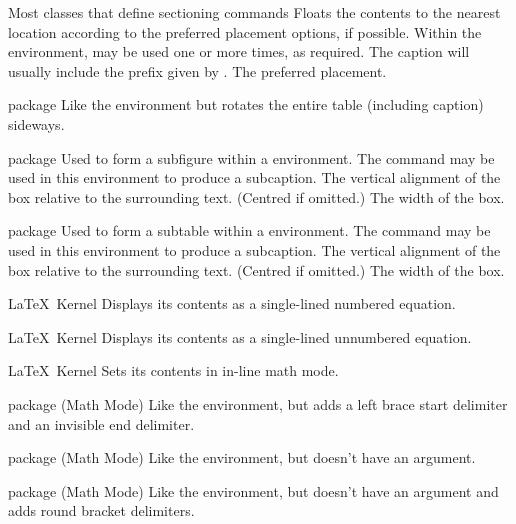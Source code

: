  {}%
 {Most classes that define sectioning commands}%
 {%
   Floats the contents to the nearest location according to the
   preferred placement options, if possible. Within the environment,
    may be used one or more times, as required.
   The caption will usually include the prefix given by
   .
 }%
 {%
   \BeginArgList
     The preferred placement.
   \EndArgList
 }

%
 {}%
 { package}%
 {Like the  environment but rotates the entire
  table (including caption) sideways.}%
 {}

%
 {}%
 { package}%
 {Used to form a subfigure within a 
  environment. The  command may be used in this
  environment to produce a subcaption.}%
 {%
   \BeginArgList
     The vertical alignment of the box relative to
     the surrounding text. (Centred if omitted.)
     The width of the box.
   \EndArgList
 }

%
 {}%
 { package}%
 {Used to form a subtable within a 
  environment. The  command may be used in this
  environment to produce a subcaption.}%
 {%
   \BeginArgList
     The vertical alignment of the box relative to
     the surrounding text. (Centred if omitted.)
     The width of the box.
   \EndArgList
 }

%
 {}%
 {\LaTeX\ Kernel}%
 {Displays its contents as a single-lined numbered equation.}%
 {}

%
 {}%
 {\LaTeX\ Kernel}%
 {Displays its contents as a single-lined unnumbered equation.}%
 {}

%
 {}%
 {\LaTeX\ Kernel}%
 {Sets its contents in in-line math mode.}%
 {}

%
 {}%
 { package (Math Mode)}%
 {%
   Like the  environment, but adds a left
   brace start delimiter and an invisible end delimiter.
 }%
 {}

%
 {}%
 { package (Math Mode)}%
 {%
   Like the  environment, but doesn't have an
   argument.
 }%
 {}

%
 {}%
 { package (Math Mode)}%
 {%
   Like the  environment, but doesn't have an
   argument and adds round bracket delimiters.
 }%
 {}

